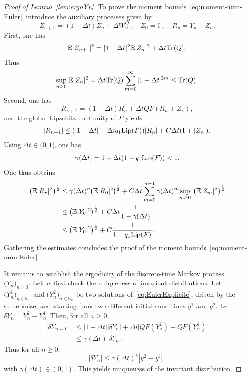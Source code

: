\documentclass[11pt]{amsart}
\newcommand{\E}{\mathbb{E}}
\newcommand{\N}{\mathbb{N}}
\begin{document}
\begin{proof}[Proof of Lemma~\ref{lem:ergoYn}]
To prove the moment bounds~\eqref{eq:moment-num-Euler}, introduce the auxiliary processes given by
\[
Z_{n+1}=(1-\Delta t)Z_n+\Delta W_n^Q~,\quad Z_0=0~,\quad R_n=Y_n-Z_n.
\]
First, one has
\[
\E|Z_{n+1}|^2=|1-\Delta t|^2\E|Z_n|^2+\Delta t {\rm Tr}(Q).
\]
Thus
\[
\underset{n\ge 0}\sup~\E|Z_n|^2=\Delta t{\rm Tr}(Q)\sum_{m=0}^{\infty}|1-\Delta t|^{2m}\le {\rm Tr}(Q).
\]
Second, one has
\[
R_{n+1}=(1-\Delta t) R_n+\Delta t QF(R_n+Z_n),
\]
and the global Lipschitz continuity of $F$ yields
\begin{align*}
|R_{n+1}|\le (|1-\Delta t|+\Delta tq_1{\rm Lip}(F))|R_n|+C\Delta t(1+|Z_n|).
\end{align*}
%
Using $\Delta t\in (0, 1]$, one has
\[
\gamma(\Delta t)=1-\Delta t(1-q_1{\rm Lip}(F)) <1.
\]
One thus obtains
\begin{align*}
\bigl(\E|R_{n}|^2\bigr)^{\frac12}&\le \gamma(\Delta t)^{n}\bigl(\E|R_0|^2\bigr)^{\frac12}+C\Delta t \sum_{m=0}^{n-1}\gamma(\Delta t)^m \underset{m\ge 0}\sup~\bigl(\E|Z_m|^2\bigr)^{\frac12}\\
&\le \bigl(\E|Y_0|^2\bigr)^{\frac12}+C\Delta t \frac{1}{1-\gamma(\Delta t)}\\
&\le \bigl(\E|Y_0|^2\bigr)^{\frac12}+C\frac{1}{1-q_1{\rm Lip}(F)}.
\end{align*}
%
Gathering the estimates concludes the proof of the moment bounds~\eqref{eq:moment-num-Euler}.

It remains to establish the ergodicity of the discrete-time Markov process $\bigl(Y_n\bigr)_{n\ge 0}$. Let us first check the uniqueness of invariant distributions. Let $\bigl(Y_n^{1}\bigr)_{n\in\N_0}$ and $\bigl(Y_n^{2}\bigr)_{n\in\N_0}$ be two solutions of~\eqref{eq:EulerExplicite}, driven by the same noise, and starting from two different initial conditions $y^1$ and $y^2$. Let $\delta Y_n=Y_n^2-Y_n^1$. Then, for all $n\ge 0$,
\begin{align*}
|\delta Y_{n+1}|&\le |1-\Delta t||\delta Y_n|+\Delta t\big|QF(Y_n^2)-QF(Y_n^1)\big|\\
&\le \gamma(\Delta t)|\delta Y_n|.
\end{align*}
Thus for all $n\ge 0$,
\[
|\delta Y_n|\le \gamma(\Delta t)^n|y^2-y^1|,
\]
with $\gamma(\Delta t)\in(0,1)$. This yields uniqueness of the invariant distribution.


\end{proof}
\end{document}
